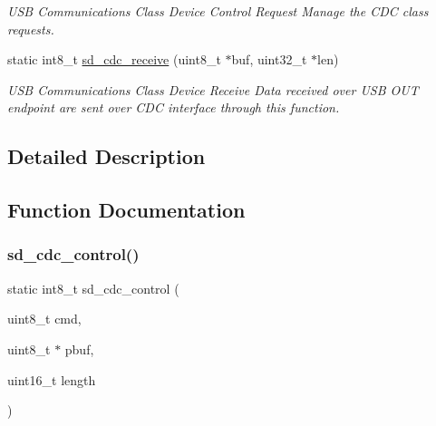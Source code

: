 \begin{DoxyCompactItemize}
\begin{DoxyCompactList}\small\item\em U\+SB Communications Class Device Control Request Manage the C\+DC class requests. \end{DoxyCompactList}\item 
static int8\+\_\+t \mbox{\hyperlink{group___s_d___u_s_b___c_d_c___i_f___functions_ga5da74bc52d86c1f85d057f7df7d7674a}{sd\+\_\+cdc\+\_\+receive}} (uint8\+\_\+t $\ast$buf, uint32\+\_\+t $\ast$len)
\begin{DoxyCompactList}\small\item\em U\+SB Communications Class Device Receive Data received over U\+SB O\+UT endpoint are sent over C\+DC interface through this function. \end{DoxyCompactList}\end{DoxyCompactItemize}


\subsection{Detailed Description}


\subsection{Function Documentation}
\mbox{\label{group___s_d___u_s_b___c_d_c___i_f___functions_ga7c03942883325c01bc3fd6410d4d1911}} 
\subsubsection{\texorpdfstring{sd\+\_\+cdc\+\_\+control()}{sd\_cdc\_control()}}
{\footnotesize\ttfamily static int8\+\_\+t sd\+\_\+cdc\+\_\+control (\begin{DoxyParamCaption}\item[{uint8\+\_\+t}]{cmd,  }\item[{uint8\+\_\+t $\ast$}]{pbuf,  }\item[{uint16\+\_\+t}]{length }\end{DoxyParamCaption})\hspace{0.3cm}{\ttfamily [static]}}



